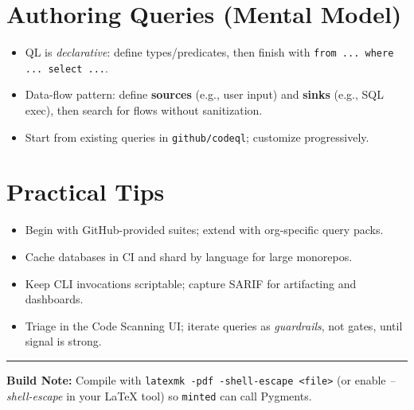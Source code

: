 \documentclass[11pt,letterpaper]{article}
\begin{document}
\section{Authoring Queries (Mental Model)}
\begin{itemize}
  \item QL is \emph{declarative}: define types/predicates, then finish with \texttt{from ... where ... select ...}.
  \item Data-flow pattern: define \textbf{sources} (e.g., user input) and \textbf{sinks} (e.g., SQL exec), then search for flows without sanitization.
  \item Start from existing queries in \texttt{github/codeql}; customize progressively.
\end{itemize}

\section{Practical Tips}
\begin{itemize}
  \item Begin with GitHub-provided suites; extend with org-specific query packs.
  \item Cache databases in CI and shard by language for large monorepos.
  \item Keep CLI invocations scriptable; capture SARIF for artifacting and dashboards.
  \item Triage in the Code Scanning UI; iterate queries as \emph{guardrails}, not gates, until signal is strong.
\end{itemize}

\vfill
\hrule
\smallskip
{\footnotesize
\textbf{Build Note:} Compile with \texttt{latexmk -pdf -shell-escape <file>} (or enable \emph{--shell-escape} in your LaTeX tool) so \texttt{minted} can call Pygments.
}
\end{document}
